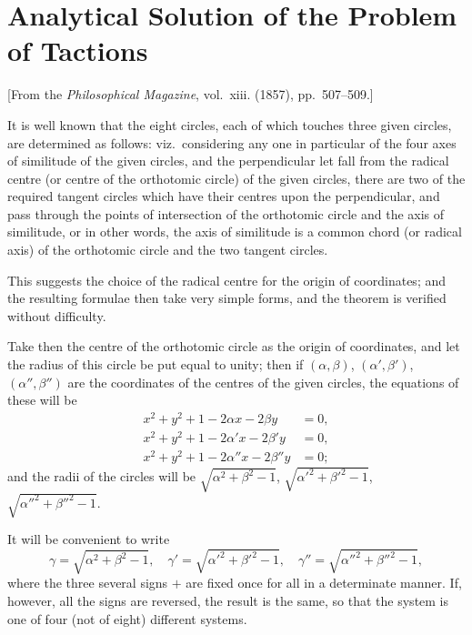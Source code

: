 \documentclass[11pt,a4paper]{book}
\begin{document}
{{\section{Analytical Solution of the Problem of Tactions}
\label{sec:207}

[From the \textit{Philosophical Magazine}, vol.~xiii. (1857), pp.~507--509.]
\vspace{1em}

It is well known that the eight circles, each of which touches three given circles, are determined as follows: viz.\ considering any one in particular of the four axes of similitude of the given circles, and the perpendicular let fall from the radical centre (or centre of the orthotomic circle) of the given circles, there are two of the required tangent circles which have their centres upon the perpendicular, and pass through the points of intersection of the orthotomic circle and the axis of similitude, or in other words, the axis of similitude is a common chord (or radical axis) of the orthotomic circle and the two tangent circles.

This suggests the choice of the radical centre for the origin of coordinates; and the resulting formulae then take very simple forms, and the theorem is verified without difficulty.

Take then the centre of the orthotomic circle as the origin of coordinates, and let the radius of this circle be put equal to unity; then if $(\alpha, \beta)$, $(\alpha', \beta')$, $(\alpha'', \beta'')$ are the coordinates of the centres of the given circles, the equations of these will be
\begin{align*}
x^2 + y^2 + 1 - 2\alpha x - 2\beta y &= 0, \\
x^2 + y^2 + 1 - 2\alpha' x - 2\beta' y &= 0, \\
x^2 + y^2 + 1 - 2\alpha'' x - 2\beta'' y &= 0;
\end{align*}
and the radii of the circles will be $\sqrt{\alpha^2 + \beta^2 - 1}$, $\sqrt{\alpha'^2 + \beta'^2 - 1}$, $\sqrt{\alpha''^2 + \beta''^2 - 1}$.

It will be convenient to write
\[
\gamma = \sqrt{\alpha^2 + \beta^2 - 1}, \quad \gamma' = \sqrt{\alpha'^2 + \beta'^2 - 1}, \quad \gamma'' = \sqrt{\alpha''^2 + \beta''^2 - 1},
\]
where the three several signs $+$ are fixed once for all in a determinate manner. If, however, all the signs are reversed, the result is the same, so that the system is one of four (not of eight) different systems.

}}
\end{document}
